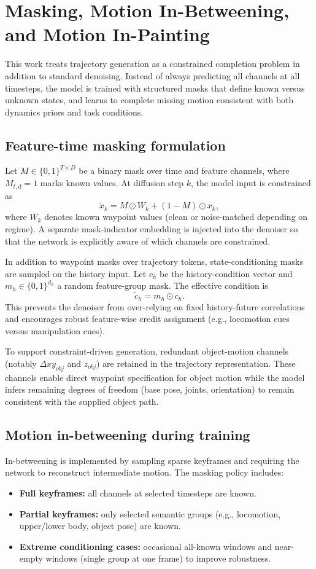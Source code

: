 \section{Masking, Motion In-Betweening, and Motion In-Painting}

This work treats trajectory generation as a constrained completion problem in addition to standard denoising. Instead of always predicting all channels at all timesteps, the model is trained with structured masks that define known versus unknown states, and learns to complete missing motion consistent with both dynamics priors and task conditions.

\subsection{Feature-time masking formulation}

Let $M\in\{0,1\}^{T\times D}$ be a binary mask over time and feature channels, where $M_{t,d}=1$ marks known values. At diffusion step $k$, the model input is constrained as
\[
\tilde x_k = M\odot W_k + (1-M)\odot x_k,
\]
where $W_k$ denotes known waypoint values (clean or noise-matched depending on regime). A separate mask-indicator embedding is injected into the denoiser so that the network is explicitly aware of which channels are constrained.

In addition to waypoint masks over trajectory tokens, state-conditioning masks are sampled on the history input. Let $c_h$ be the history-condition vector and $m_h\in\{0,1\}^{d_h}$ a random feature-group mask. The effective condition is
\[
\tilde c_h = m_h\odot c_h.
\]
This prevents the denoiser from over-relying on fixed history-future correlations and encourages robust feature-wise credit assignment (e.g., locomotion cues versus manipulation cues).

To support constraint-driven generation, redundant object-motion channels (notably $\Delta xy_{obj}$ and $z_{obj}$) are retained in the trajectory representation. These channels enable direct waypoint specification for object motion while the model infers remaining degrees of freedom (base pose, joints, orientation) to remain consistent with the supplied object path.

\subsection{Motion in-betweening during training}

In-betweening is implemented by sampling sparse keyframes and requiring the network to reconstruct intermediate motion. The masking policy includes:
\begin{itemize}
    \item \textbf{Full keyframes:} all channels at selected timesteps are known.
    \item \textbf{Partial keyframes:} only selected semantic groups (e.g., locomotion, upper/lower body, object pose) are known.
    \item \textbf{Extreme conditioning cases:} occasional all-known windows and near-empty windows (single group at one frame) to improve robustness.
\end{itemize}

